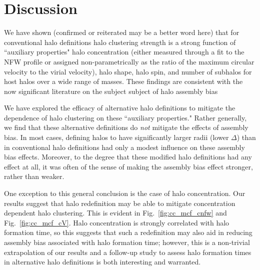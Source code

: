 \documentclass[usenatbib,usegraphicx,letterpaper]{mn2e}
\begin{document}
\section{Discussion}
\label{section:discussion}


We have shown (confirmed or reiterated may be a better word here) that for conventional halo definitions 
halo clustering strength is a strong function of ``auxiliary properties" halo concentration (either measured through a fit to the 
NFW profile or assigned non-parametrically as the ratio of the maximum circular velocity to the virial 
velocity), halo shape, halo spin, and number of subhalos 
for host halos over a wide range of masses. These findings are consistent 
with the now significant literature on the subject subject of halo assembly bias 

We have explored the efficacy of alternative halo definitions to mitigate the dependence of halo 
clustering on these ``auxiliary properties." Rather generally, we find that these alternative definitions 
do {\em not} mitigate the effects of assembly bias. In most cases, defining halos to have significantly 
larger radii (lower $\Delta$) than in conventional halo definitions had only a modest influence on 
these assembly bias effects. Moreover, to the degree that these modified halo definitions had 
any effect at all, it was often of the sense of 
making the assembly bias effect stronger, rather than weaker. 

One exception to this general conclusion is the case of halo concentration. 
Our results suggest that halo redefinition may be able to mitigate concentration 
dependent halo clustering. This is evident in Fig.~\ref{fig:cc_mcf_cnfw} and 
Fig.~\ref{fig:cc_mcf_cV}. Halo concentration is strongly correlated with halo formation 
time, so this suggests that such a redefinition may also aid in reducing assembly bias 
associated with halo formation time; however, this is a non-trivial extrapolation of our 
results and a follow-up study to assess halo formation times in alternative halo definitions 
is both interesting and warranted. 
\end{document}
